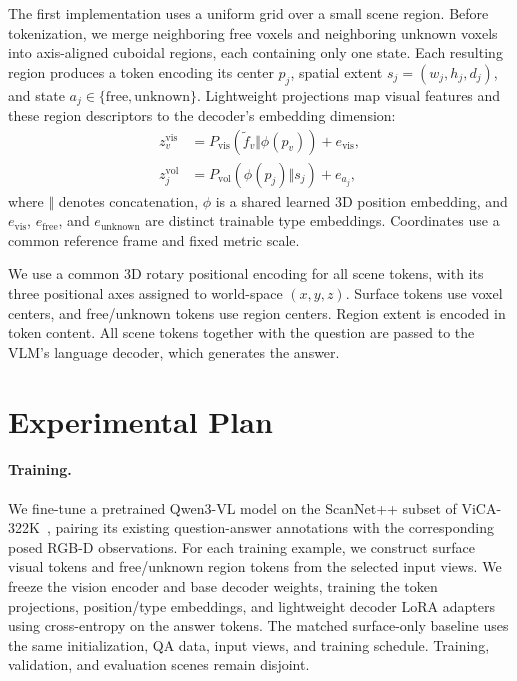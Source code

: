\documentclass[10pt,twocolumn,letterpaper]{article}
\begin{document}
The first implementation uses a uniform grid over a small scene region. Before tokenization, we merge neighboring free voxels and neighboring unknown voxels into axis-aligned cuboidal regions, each containing only one state. Each resulting region produces a token encoding its center $p_j$, spatial extent $s_j=(w_j,h_j,d_j)$, and state $a_j\in\{\mathrm{free},\mathrm{unknown}\}$. Lightweight projections map visual features and these region descriptors to the decoder's embedding dimension:
\begin{equation}
\begin{aligned}
z_v^{\mathrm{vis}}&=P_{\mathrm{vis}}(\tilde f_v\Vert\phi(p_v))+e_{\mathrm{vis}},\\
z_j^{\mathrm{vol}}&=P_{\mathrm{vol}}(\phi(p_j)\Vert s_j)+e_{a_j},
\end{aligned}
\end{equation}
where $\Vert$ denotes concatenation, $\phi$ is a shared learned 3D position embedding, and $e_{\mathrm{vis}}$, $e_{\mathrm{free}}$, and $e_{\mathrm{unknown}}$ are distinct trainable type embeddings. Coordinates use a common reference frame and fixed metric scale.

We use a common 3D rotary positional encoding for all scene tokens, with its three positional axes assigned to world-space $(x,y,z)$. Surface tokens use voxel centers, and free/unknown tokens use region centers. Region extent is encoded in token content. All scene tokens together with the question are passed to the VLM's language decoder, which generates the answer.

\section{Experimental Plan}

\paragraph{Training.}
We fine-tune a pretrained Qwen3-VL model on the ScanNet++ subset of ViCA-322K~\cite{vica}, pairing its existing question-answer annotations with the corresponding posed RGB-D observations. For each training example, we construct surface visual tokens and free/unknown region tokens from the selected input views. We freeze the vision encoder and base decoder weights, training the token projections, position/type embeddings, and lightweight decoder LoRA adapters using cross-entropy on the answer tokens. The matched surface-only baseline uses the same initialization, QA data, input views, and training schedule. Training, validation, and evaluation scenes remain disjoint.
\end{document}
